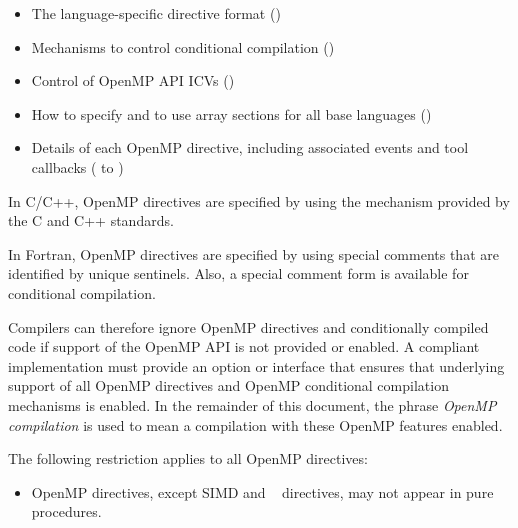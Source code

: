 \begin{itemize}
\item The language-specific directive format
()

\item Mechanisms to control conditional compilation
()

\item Control of OpenMP API ICVs
()

\item How to specify and to use array sections for all base languages
()

\item Details of each OpenMP directive, including associated events and tool callbacks
( to
)
\end{itemize}

\begin{ccppspecific}
In C/C++, OpenMP directives are specified by using the  mechanism provided
by the C and C++ standards.
\end{ccppspecific}

\begin{fortranspecific}
In Fortran, OpenMP directives are specified by using special comments that are
identified by unique sentinels. Also, a special comment form is available for conditional
compilation.
\end{fortranspecific}

Compilers can therefore ignore OpenMP directives and conditionally compiled code if
support of the OpenMP API is not provided or enabled. A compliant implementation
must provide an option or interface that ensures that underlying support of all OpenMP
directives and OpenMP conditional compilation mechanisms is enabled. In the
remainder of this document, the phrase \emph{OpenMP compilation} is used to mean a
compilation with these OpenMP features enabled.

\begin{samepage}
\begin{fortranspecific}
\restrictions
The following restriction applies to all OpenMP directives:
\begin{itemize}
\item OpenMP directives, except SIMD and ~ directives,
 may not appear in pure procedures.
\end{itemize}
\end{fortranspecific}
\end{samepage}


